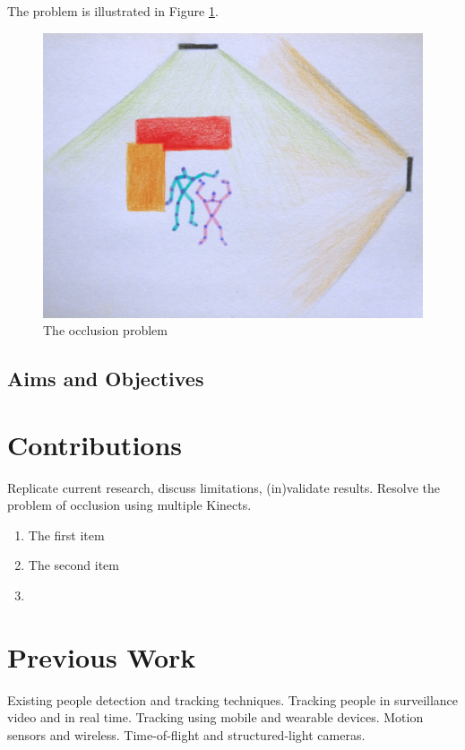 \documentclass{sigchi}
\begin{document}
The problem is illustrated in Figure \ref{fig:occlusion_problem}.

\begin{figure}[!h]
  \centering
  \includegraphics[width=0.9\columnwidth]{occlusion_problem}
  \caption{The occlusion problem}
  \label{fig:occlusion_problem}
\end{figure}

\subsection{Aims and Objectives}

\section{Contributions}
\label{sec:contributions}

Replicate current research, discuss limitations, (in)validate results. Resolve the problem of occlusion using multiple Kinects. 

\begin{enumerate}
  \item The first item
  \item The second item
  \item 
\end{enumerate}

\section{Previous Work}
\label{sec:previous_work}

Existing people detection and tracking techniques. Tracking people in surveillance video and in real time. Tracking using mobile and wearable devices. Motion sensors and wireless. Time-of-flight and structured-light cameras.
\end{document}
